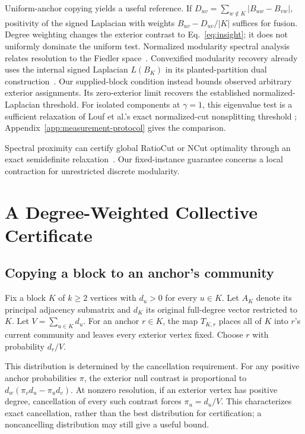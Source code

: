 \documentclass[sigconf,anonymous,review]{acmart}
\newcommand{\1}{\mathbf{1}}
\begin{document}
Uniform-anchor copying yields a useful reference. If
$D_{uv}=\sum_{w\notin K}|B_{uw}-B_{vw}|$, positivity of the signed Laplacian
with weights $B_{uv}-D_{uv}/|K|$ suffices for fusion. Degree weighting changes
the exterior contrast to Eq.~\eqref{eq:insight}; it does not uniformly dominate
the uniform test. Normalized modularity spectral analysis relates resolution to the Fiedler
space~\cite{floros2023fiedler}. Convexified modularity recovery already uses
the internal signed Laplacian $L(B_K)$ in its planted-partition dual
construction~\cite{chen2018convexified}. Our supplied-block condition instead
bounds observed arbitrary exterior assignments. Its zero-exterior limit
recovers the established normalized-Laplacian threshold. For isolated
components at $\gamma=1$, this eigenvalue test is a sufficient relaxation of
Louf et al.'s exact normalized-cut nonsplitting threshold
\cite{louf2024expansion}; Appendix~\ref{app:measurement-protocol} gives
the comparison.

Spectral
proximity can certify global RatioCut or NCut optimality through an exact
semidefinite relaxation~\cite{ling2020certifying}. Our fixed-instance guarantee
concerns a local contraction for unrestricted discrete modularity.

\section{A Degree-Weighted Collective Certificate}
\subsection{Copying a block to an anchor's community}
Fix a block $K$ of $k\geq 2$ vertices with $d_u>0$ for every $u\in K$.
Let $A_K$ denote its principal adjacency submatrix and $d_K$ its original
full-degree vector restricted to $K$.
Let $V=\sum_{u\in K}d_u$. For an anchor $r\in K$, the map $T_{K,r}$ places
all of $K$ into $r$'s current community and leaves every exterior vertex fixed.
Choose $r$ with probability $d_r/V$.

This distribution is determined by the cancellation requirement. For any
positive anchor probabilities $\pi$, the exterior null contrast is proportional
to $d_w(\pi_vd_u-\pi_ud_v)$. At nonzero resolution, if an exterior vertex has
positive degree, cancellation of every such contrast forces $\pi_u=d_u/V$.
This characterizes exact cancellation, rather than the best distribution for
certification; a noncancelling distribution may still give a useful bound.
\end{document}

